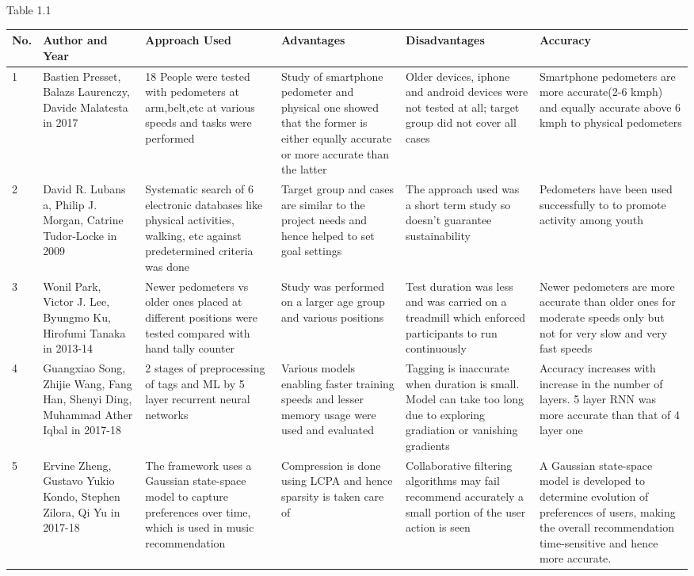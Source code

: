 \documentclass[10pt, a4paper]{article}
\begin{document}
\begin{landscape}
\begin{center}
Table 1.1
\bigbreak
\begin{tabular}{ | m{0.5cm} | m{3.5cm}| m{5cm} | m{4.5cm}| m{5cm}| m{5.5cm}|} 
\hline \hline
No. & Author and Year & Approach Used & Advantages & Disadvantages & Accuracy\\ 
\hline
\hline
1 & Bastien Presset, Balazs Laurenczy, Davide Malatesta in 2017 &18 People were tested with pedometers at arm,belt,etc at various speeds and tasks were performed & Study of smartphone pedometer and physical one showed that the former is either equally accurate or more accurate than the latter & Older devices, iphone and android devices were not tested at all; target group did not cover all cases & Smartphone pedometers are more accurate(2-6 kmph) and equally accurate above 6 kmph to physical pedometers\\ 
\hline
2 & David R. Lubans a, Philip J. Morgan, Catrine Tudor-Locke in 2009 & Systematic search of 6 electronic databases like physical activities, walking, etc against predetermined criteria was done & Target group and cases are similar to the project needs and hence helped to set goal settings & The approach used was a short term study so doesn't guarantee sustainability & Pedometers have been used successfully to to promote activity among youth\\ 
\hline
3 & Wonil Park, Victor J. Lee, Byungmo Ku, Hirofumi Tanaka in 2013-14 & Newer pedometers vs older ones placed at different positions were tested compared with hand tally counter  & Study was performed on a larger age group and various positions & Test duration was less and was carried on a treadmill which enforced participants to run continuously & Newer pedometers are more accurate than older ones for moderate speeds only but not for very slow and very fast speeds\\ 
\hline
4 & Guangxiao Song, Zhijie Wang, Fang Han, Shenyi Ding, Muhammad Ather Iqbal in 2017-18 & 2 stages of preprocessing of tags and ML by 5 layer recurrent neural networks & Various models enabling faster training speeds and lesser memory usage were used and evaluated & Tagging is inaccurate when duration is small. Model can take too long due to exploring gradiation or vanishing gradients & Accuracy increases with increase in the number of layers. 5 layer RNN was more accurate than that of 4 layer one\\ 
\hline
5 & Ervine Zheng, Gustavo Yukio Kondo, Stephen Zilora, Qi Yu in 2017-18 & The framework uses a Gaussian state-space model to capture preferences over time, which is used in music recommendation & Compression is done using LCPA and hence sparsity is taken care of & Collaborative filtering algorithms may fail recommend accurately a small portion of the user action is seen & A Gaussian state-space model is developed to determine evolution of preferences of users, making the overall recommendation time-sensitive and hence more accurate.\\ 

\end{tabular}
\end{center}
\end{landscape}
\end{document}
